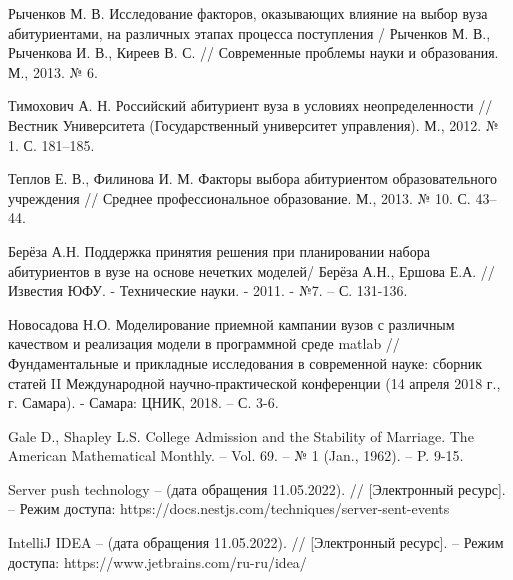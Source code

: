 \begin{thebibliography}{}
	Рыченков М. В. Исследование факторов, оказывающих влияние на выбор вуза абитуриентами, на различных этапах процесса поступления / Рыченков М. В., Рыченкова И. В., 
	Киреев В. С. // Современные проблемы науки и образования. М., 2013. № 6.

	Тимохович А. Н. Российский абитуриент вуза в условиях неопределенности // Вестник 
	Университета (Государственный университет управления). М., 2012. № 1. С. 181–185.

	Теплов Е. В., Филинова И. М. Факторы выбора абитуриентом образовательного учреждения // Среднее профессиональное образование. М., 2013. № 10. С. 43–44.

	Берёза А.Н. Поддержка принятия решения при планировании набора абитуриентов в вузе на основе нечетких моделей/ Берёза А.Н., Ершова Е.А. // Известия ЮФУ. - Технические науки. - 2011. - №7. – С. 131-136.

	Новосадова Н.О. Моделирование приемной кампании вузов с различным качеством и реализация модели в программной среде matlab // Фундаментальные и прикладные исследования в современной науке: сборник статей II Международной научно-практической конференции (14 апреля 2018 г., г. Самара). - Самара: ЦНИК, 2018. – С. 3-6.

	Gale D., Shapley L.S. College Admission and the Stability of Marriage. The American Mathematical Monthly. –
	Vol. 69. – № 1 (Jan., 1962). – P. 9-15.
	
	Server push technology – (дата обращения 11.05.2022). // [Электронный ресурс]. – Режим доступа: https://docs.nestjs.com/techniques/server-sent-events
	
	IntelliJ IDEA – (дата обращения 11.05.2022). // [Электронный ресурс]. – Режим доступа: https://www.jetbrains.com/ru-ru/idea/

\end{thebibliography}
\endgroup

\pagebreak